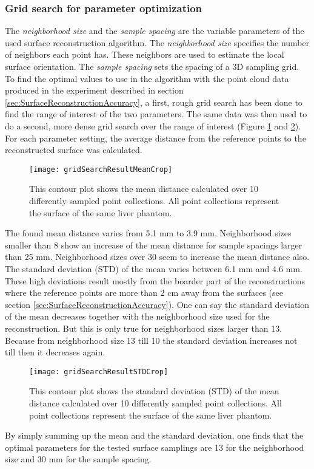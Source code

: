 \subsubsection{Grid search for parameter optimization}
The \textit{neighborhood size} and the \textit{sample spacing} are the variable
parameters of the used surface reconstruction algorithm. The \textit{neighborhood size}
specifies the number of neighbors each point has. These neighbors are used to
estimate the local surface orientation. The \textit{sample spacing} sets the
spacing of a 3D sampling grid.
To find the optimal values to use in the algorithm with the point cloud data produced in the
experiment described in section \ref{sec:SurfaceReconstructionAccuracy}, a
first, rough grid search has been done to find the range of interest
of the two parameters. The same data was then used to do a second, more dense
grid search over the range of interest (Figure \ref{fig:gridSearchResultMean} and
\ref{fig:gridSearchResultSTD}). For each parameter setting, the average distance from the
reference points to the reconstructed surface was calculated.
\begin{figure}[h]
  \centering
 \texttt{[image: gridSearchResultMeanCrop]}
  \caption{This contour plot shows the mean distance calculated over 10
    differently sampled point collections. All point collections represent the
    surface of the same liver phantom.}
  \label{fig:gridSearchResultMean}
\end{figure}
The found mean distance varies from 5.1 mm to 3.9 mm. Neighborhood sizes smaller
than 8 show an increase of the mean distance for sample spacings larger than 25
mm. Neighborhood sizes over 30 seem to increase the mean distance also.
The standard deviation (STD) of the mean varies between 6.1 mm and 4.6 mm. These high
deviations result mostly from the boarder part of the reconstructions where the
reference points are more than 2 cm away from the surfaces (see section
\ref{sec:SurfaceReconstructionAccuracy}). One can say the standard deviation of
the mean decreases together with the neighborhood size used for the
reconstruction. But this is only true for neighborhood sizes larger than 13.
Because from neighborhood size 13 till 10 the standard deviation increases not
till then it decreases again. 
\begin{figure}[h]
  \centering
 \texttt{[image: gridSearchResultSTDCrop]}
  \caption{This contour plot shows the standard deviation (STD) of the mean distance calculated over 10
    differently sampled point collections. All point collections represent the
    surface of the same liver phantom.}
  \label{fig:gridSearchResultSTD}
\end{figure}
By simply summing up the mean and the standard deviation, one finds that the
optimal parameters for the tested surface samplings are 13 for the neighborhood
size and 30 mm for the sample spacing.
